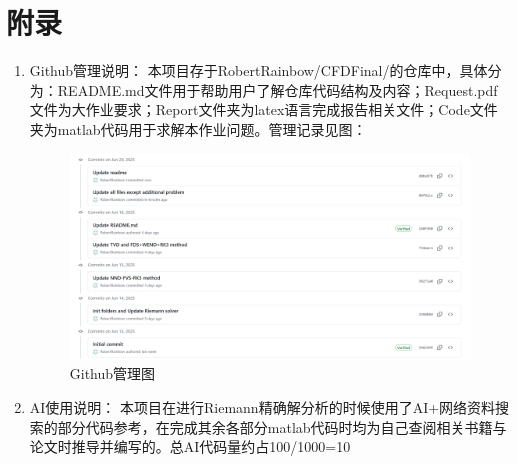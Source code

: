 \documentclass[12pt,a4paper]{article}%
\begin{document}
		
	\section{附录}
		\begin{enumerate}
			\item Github管理说明：
			本项目存于RobertRainbow/CFDFinal/的仓库中，具体分为：README.md文件用于帮助用户了解仓库代码结构及内容；Request.pdf文件为大作业要求；Report文件夹为latex语言完成报告相关文件；Code文件夹为matlab代码用于求解本作业问题。管理记录见图：
			\begin{figure}[H]
				\centering
				\begin{minipage}{0.83\textwidth}
					\centering
					\includegraphics[width=\textwidth]{./fig/git.png}
					\caption{\fontsize{10pt}{15pt}\selectfont Github管理图}
				\end{minipage}
			\end{figure}
			
			\item AI使用说明：
			本项目在进行Riemann精确解分析的时候使用了AI+网络资料搜索的部分代码参考，在完成其余各部分matlab代码时均为自己查阅相关书籍与论文时推导并编写的。总AI代码量约占100/1000=10%
		\end{enumerate}
	
\end{document}

